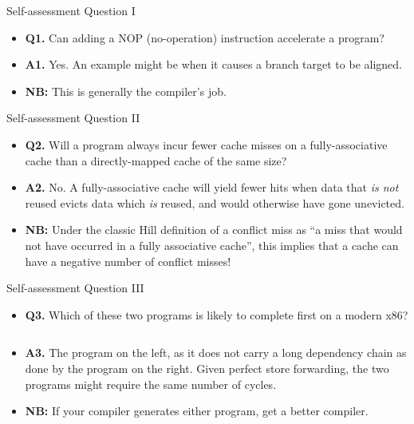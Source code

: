 \documentclass{beamer}
\newcommand{\code}[2]{
  \tiny{{}}
}
\begin{document}
\begin{frame}{Self-assessment Question I}
\begin{itemize}
\item \textbf{Q1.} Can adding a NOP (no-operation) instruction accelerate a program?
\item \textbf{A1.} Yes. An example might be when it causes a branch target to 
 be aligned.
\item \textbf{NB:} This is generally the compiler's job.
\end{itemize}
\end{frame}

\begin{frame}{Self-assessment Question II}
\begin{itemize}
\item \textbf{Q2.} Will a program always incur fewer cache misses on a fully-associative
	cache than a directly-mapped cache of the same size?
\item \textbf{A2.} No. A fully-associative cache will yield fewer hits when
  data that \textit{is not} reused evicts data which \textit{is} reused, and
  would otherwise have gone unevicted.
\item \textbf{NB:} Under the classic Hill definition of a conflict miss as ``a
  miss that would not have occurred in a fully associative cache'', this
  implies that a cache can have a negative number of conflict misses!
\end{itemize}
\end{frame}

\begin{frame}{Self-assessment Question III}
\begin{itemize}
\item \textbf{Q3.} Which of these two programs is likely to complete first
	on a modern x86?\\
\begin{columns}
\begin{column}{.5\textwidth}
\code{A}{code/introq3a.S}
\end{column}
\begin{column}{.5\textwidth}
\code{B}{code/introq3b.S}
\end{column}
\end{columns}
\item \textbf{A3.} The program on the left, as it does not carry a long
	dependency chain as done by the program on the right. Given perfect
	store forwarding, the two programs might require the same number of
	cycles.
\item \textbf{NB:} If your compiler generates either program, get a better compiler.
\end{itemize}
\end{frame}
\end{document}
